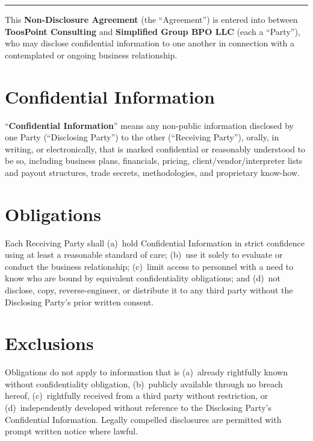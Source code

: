 \documentclass{toospoint}
\begin{document}

\thispagestyle{fancy}

\vspace{4pt}
{\color{TPOrange}\rule{\linewidth}{1pt}}
\vspace{6pt}

{\sffamily\footnotesize\noindent
This \textbf{Non-Disclosure Agreement} (the ``Agreement'') is entered into between
\textbf{ToosPoint Consulting} and \textbf{Simplified Group BPO LLC} (each a
``Party''), who may disclose confidential information to one another in connection
with a contemplated or ongoing business relationship.\par}

\small

\section{Confidential Information}
\noindent``\textbf{Confidential Information}'' means any non-public information disclosed
by one Party (``Disclosing Party'') to the other (``Receiving Party''), orally, in
writing, or electronically, that is marked confidential or reasonably understood
to be so, including business plans, financials, pricing, client/vendor/interpreter
lists and payout structures, trade secrets, methodologies, and proprietary know-how.

\section{Obligations}
\noindent Each Receiving Party shall (a)~hold Confidential Information in strict confidence
using at least a reasonable standard of care; (b)~use it solely to evaluate or
conduct the business relationship; (c)~limit access to personnel with a need to
know who are bound by equivalent confidentiality obligations; and (d)~not disclose,
copy, reverse-engineer, or distribute it to any third party without the Disclosing
Party's prior written consent.

\section{Exclusions}
\noindent Obligations do not apply to information that is (a)~already rightfully known
without confidentiality obligation, (b)~publicly available through no breach
hereof, (c)~rightfully received from a third party without restriction, or
(d)~independently developed without reference to the Disclosing Party's
Confidential Information. Legally compelled disclosures are permitted with prompt
written notice where lawful.
\end{document}
